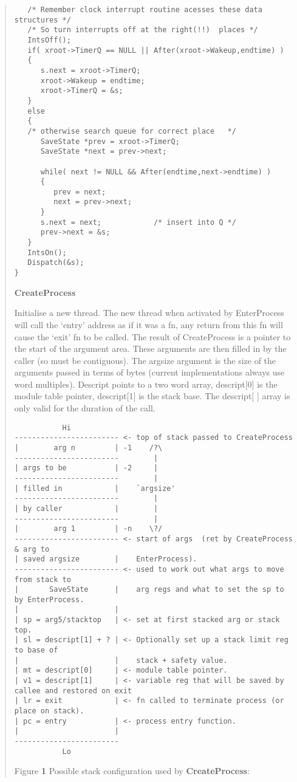 \begin{enumerate}
\begin{quote}
\begin{verbatim}
   /* Remember clock interrupt routine acesses these data structures */
   /* So turn interrupts off at the right(!!)  places */
   IntsOff();
   if( xroot->TimerQ == NULL || After(xroot->Wakeup,endtime) )
   {
      s.next = xroot->TimerQ;
      xroot->Wakeup = endtime;
      xroot->TimerQ = &s;   
   }
   else
   {
   /* otherwise search queue for correct place   */
      SaveState *prev = xroot->TimerQ;
      SaveState *next = prev->next;
   
      while( next != NULL && After(endtime,next->endtime) )
      {
         prev = next;
         next = prev->next;
      }
      s.next = next;            /* insert into Q */
      prev->next = &s;
   }
   IntsOn();
   Dispatch(&s);
}
\end{verbatim}
\normalsize

\item {\bf CreateProcess}

Initialise a new thread. The new thread when activated by EnterProcess
will call the `entry' address as if it was a fn, any return from this fn
will cause the `exit' fn to be called. The result of CreateProcess
is a pointer to the start of the argument area. These arguments are then
filled in by the caller (so must be contiguous). The argsize argument is the
size of the arguments passed in terms of bytes (current implementations
always use word multiples). Descript points to a two word
array, descript[0] is the module table pointer, descript[1] is the stack base.
The descript[ ] array is only valid for the duration of the call.

\scriptsize
\begin{verbatim}
           Hi
------------------------ <- top of stack passed to CreateProcess
|        arg n         | -1    /?\
------------------------        |
| args to be           | -2     |
------------------------        |
| filled in            |    `argsize'
------------------------        |
| by caller            |        |
------------------------        |
|        arg 1         | -n    \?/
------------------------ <- start of args  (ret by CreateProcess & arg to
| saved argsize        |    EnterProcess). 
------------------------ <- used to work out what args to move from stack to
|       SaveState      |    arg regs and what to set the sp to by EnterProcess.
|                      |
| sp = arg5/stacktop   | <- set at first stacked arg or stack top.
| sl = descript[1] + ? | <- Optionally set up a stack limit reg to base of 
|                      |    stack + safety value.
| mt = descript[0]     | <- module table pointer.
| v1 = descript[1]     | <- variable reg that will be saved by callee and restored on exit
| lr = exit            | <- fn called to terminate process (or place on stack).
| pc = entry           | <- process entry function.
|                      |
------------------------
           Lo
\end{verbatim}
\normalsize
\begin{center}
Figure {\bf 1} Possible stack configuration used by {\bf CreateProcess}:
\end{center}
\vspace{0.25cm}


\end{quote}
\end{enumerate}
